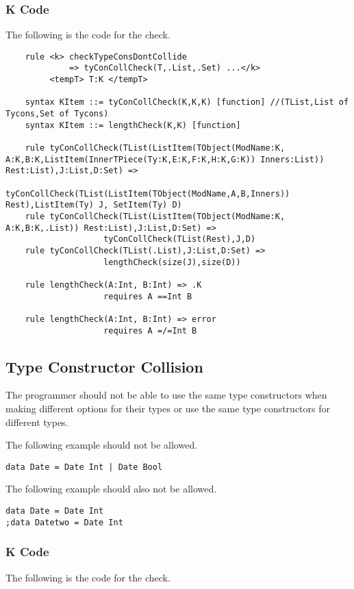 \subsubsection{K Code}
The following is the code for the check.
\begin{lstlisting}
    rule <k> checkTypeConsDontCollide
             => tyConCollCheck(T,.List,.Set) ...</k>
         <tempT> T:K </tempT>

    syntax KItem ::= tyConCollCheck(K,K,K) [function] //(TList,List of Tycons,Set of Tycons) 
    syntax KItem ::= lengthCheck(K,K) [function]

    rule tyConCollCheck(TList(ListItem(TObject(ModName:K, A:K,B:K,ListItem(InnerTPiece(Ty:K,E:K,F:K,H:K,G:K)) Inners:List)) Rest:List),J:List,D:Set) => 
                    tyConCollCheck(TList(ListItem(TObject(ModName,A,B,Inners)) Rest),ListItem(Ty) J, SetItem(Ty) D)
    rule tyConCollCheck(TList(ListItem(TObject(ModName:K, A:K,B:K,.List)) Rest:List),J:List,D:Set) => 
                    tyConCollCheck(TList(Rest),J,D)
    rule tyConCollCheck(TList(.List),J:List,D:Set) => 
                    lengthCheck(size(J),size(D))

    rule lengthCheck(A:Int, B:Int) => .K
                    requires A ==Int B

    rule lengthCheck(A:Int, B:Int) => error
                    requires A =/=Int B
\end{lstlisting}

\subsection{Type Constructor Collision}
The programmer should not be able to use the same type constructors when making different options for their types or use the same type constructors for different types.

The following example should not be allowed.
\begin{lstlisting}
data Date = Date Int | Date Bool
\end{lstlisting}

The following example should also not be allowed.
\begin{lstlisting}
data Date = Date Int
;data Datetwo = Date Int
\end{lstlisting}

\subsubsection{K Code}
The following is the code for the check.

